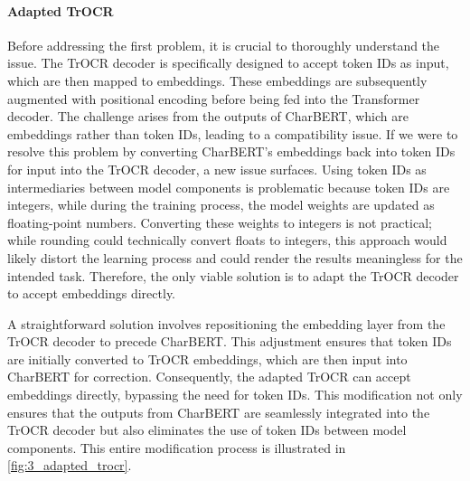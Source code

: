 \paragraph*{Adapted TrOCR}
\label{par:3_adapted_trocr}
Before addressing the first problem, it is crucial to thoroughly understand the issue. The TrOCR decoder is specifically designed to accept token IDs as input, which are then mapped to embeddings. These embeddings are subsequently augmented with positional encoding before being fed into the Transformer decoder. The challenge arises from the outputs of CharBERT, which are embeddings rather than token IDs, leading to a compatibility issue. If we were to resolve this problem by converting CharBERT's embeddings back into token IDs for input into the TrOCR decoder, a new issue surfaces. Using token IDs as intermediaries between model components is problematic because token IDs are integers, while during the training process, the model weights are updated as floating-point numbers. Converting these weights to integers is not practical; while rounding could technically convert floats to integers, this approach would likely distort the learning process and could render the results meaningless for the intended task. Therefore, the only viable solution is to adapt the TrOCR decoder to accept embeddings directly.

A straightforward solution involves repositioning the embedding layer from the TrOCR decoder to precede CharBERT. This adjustment ensures that token IDs are initially converted to TrOCR embeddings, which are then input into CharBERT for correction. Consequently, the adapted TrOCR can accept embeddings directly, bypassing the need for token IDs. This modification not only ensures that the outputs from CharBERT are seamlessly integrated into the TrOCR decoder but also eliminates the use of token IDs between model components. This entire modification process is illustrated in \autoref{fig:3_adapted_trocr}. 



